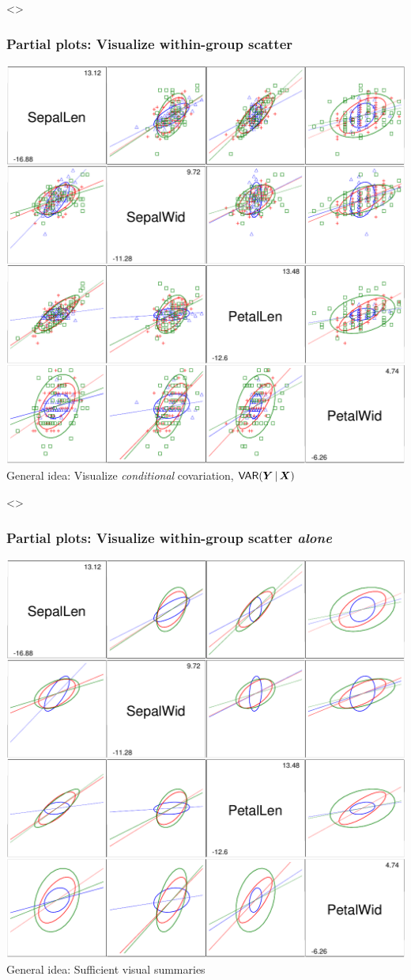 \begin{frame}<\inlong>
  \frametitle{Partial plots: Visualize within-group scatter}
\begin{center}
  \includegraphics[height=.8\textheight,clip]{fig/scatirisd2}
  \\ General idea: Visualize \emph{conditional} covariation, 
   $\mathsf{VAR}(\bm{Y} \, | \, \bm{X})$
\end{center}
\end{frame}

\begin{frame}<\inlong>
  \frametitle{Partial plots: Visualize within-group scatter \emph{alone}}
\begin{center}
  \includegraphics[height=.8\textheight,clip]{fig/scatirisd4}
 \\ General idea: Sufficient visual summaries
\end{center}
\end{frame}


